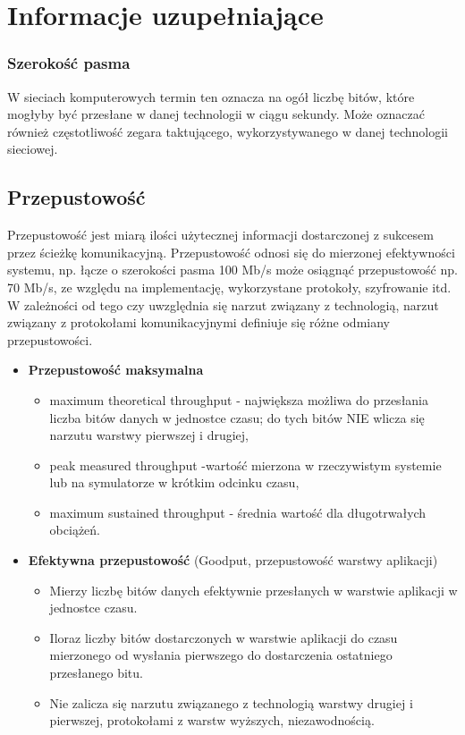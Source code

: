 \documentclass[a4paper]{article}
\begin{document}
\section{Informacje uzupełniające}
\subsubsection{Szerokość pasma}
W sieciach komputerowych termin ten oznacza na ogół liczbę bitów, które mogłyby być
przesłane w danej technologii w ciągu sekundy. Może oznaczać również częstotliwość zegara
taktującego, wykorzystywanego w danej technologii sieciowej.

\subsection{Przepustowość}
Przepustowość jest miarą ilości użytecznej informacji dostarczonej z sukcesem przez ścieżkę
komunikacyjną. Przepustowość odnosi się do mierzonej efektywności systemu, np. łącze o
szerokości pasma 100 Mb/s może osiągnąć przepustowość np. 70 Mb/s, ze względu na
implementację, wykorzystane protokoły, szyfrowanie itd.\\

W zależności od tego czy uwzględnia się narzut związany z technologią, narzut związany z protokołami komunikacyjnymi definiuje się różne odmiany przepustowości.
\begin{itemize}
    \item \textbf{Przepustowość maksymalna}
    \begin{itemize}
        \item maximum theoretical throughput - największa możliwa do przesłania liczba bitów danych w jednostce czasu; do tych bitów NIE wlicza się narzutu warstwy pierwszej i drugiej,
        \item peak measured throughput -wartość mierzona w rzeczywistym systemie lub na symulatorze w krótkim odcinku czasu,
        \item maximum sustained throughput - średnia wartość dla długotrwałych obciążeń.
    \end{itemize}
    \item \textbf{Efektywna przepustowość} (Goodput, przepustowość warstwy aplikacji)\\
    \begin{itemize}
        \item Mierzy liczbę bitów danych efektywnie przesłanych w warstwie aplikacji w jednostce czasu.
        \item Iloraz liczby bitów dostarczonych w warstwie aplikacji do czasu mierzonego od wysłania pierwszego do dostarczenia ostatniego przesłanego bitu.
        \item Nie zalicza się narzutu związanego z technologią warstwy drugiej i pierwszej, protokołami z warstw wyższych, niezawodnością.
    \end{itemize}
\end{itemize}
\end{document}
